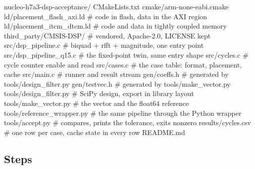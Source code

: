 \begin{plaincode}
nucleo-h7a3-dsp-acceptance/
  CMakeLists.txt
  cmake/arm-none-eabi.cmake
  ld/placement_flash_axi.ld     # code in flash, data in the AXI region
  ld/placement_itcm_dtcm.ld     # code and data in tightly coupled memory
  third_party/CMSIS-DSP/        # vendored, Apache-2.0, LICENSE kept
  src/dsp_pipeline.c            # biquad + rfft + magnitude, one entry point
  src/dsp_pipeline_q15.c        # the fixed-point twin, same entry shape
  src/cycles.c                  # cycle counter enable and read
  src/cases.c                   # the case table: format, placement, cache
  src/main.c                    # runner and result stream
  gen/coeffs.h                  # generated by tools/design_filter.py
  gen/testvec.h                 # generated by tools/make_vector.py
  tools/design_filter.py        # SciPy design, export in library layout
  tools/make_vector.py          # the vector and the float64 reference
  tools/reference_wrapper.py    # the same pipeline through the Python wrapper
  tools/accept.py               # compares, prints the tolerance, exits nonzero
  results/cycles.csv            # one row per case, cache state in every row
  README.md
\end{plaincode}

\subsection*{Steps}

